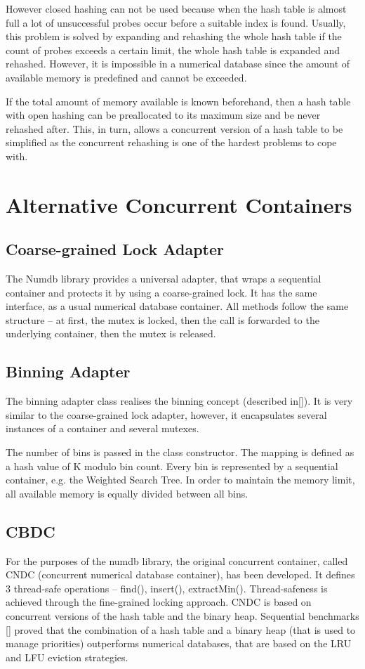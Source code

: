 However closed hashing can not be used because when the hash table is almost full a lot of unsuccessful probes occur before a suitable index is found. Usually, this problem is solved by expanding and rehashing the whole hash table if the count of probes exceeds a certain limit, the whole hash table is expanded and rehashed. However, it is impossible in a numerical database since the amount of available memory is predefined and cannot be exceeded.

If the total amount of memory available is known beforehand, then a hash table with open hashing can be preallocated to its maximum size and be never rehashed after. This, in turn, allows a concurrent version of a hash table to be simplified as the concurrent rehashing is one of the hardest problems to cope with.



\section{Alternative Concurrent Containers}

\subsection{Coarse-grained Lock Adapter}
The Numdb library provides a universal adapter, that wraps a sequential container and protects it by using a coarse-grained lock. It has the same interface, as a usual numerical database container. All methods follow the same structure – at first, the mutex is locked, then the call is forwarded to the underlying container, then the mutex is released.

\subsection{Binning Adapter}
The binning adapter class realises the binning concept (described in[]). It is very similar to the coarse-grained lock adapter, however, it encapsulates several instances of a container and several mutexes.

The number of bins is passed in the class constructor. The mapping is defined as a hash value of K modulo bin count. Every bin is represented by a sequential container, e.g. the Weighted Search Tree. In order to maintain the memory limit, all available memory is equally divided between all bins.

\subsection{CBDC}
For the purposes of the numdb library, the original concurrent container, called CNDC (concurrent numerical database container), has been developed. It defines 3 thread-safe operations – find(), insert(), extractMin(). Thread-safeness is achieved through the fine-grained locking approach. CNDC is based on concurrent versions of the hash table and the binary heap. Sequential benchmarks [] proved that the combination of a hash table and a binary heap (that is used to manage priorities) outperforms numerical databases, that are based on the LRU and LFU eviction strategies.

